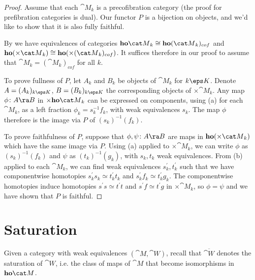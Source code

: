 \begin{proof}
Assume that each ${\cat M}_k$ is a precofibration category (the proof for prefibration categories is dual). Our functor $P$ is a bijection on objects, and we'd like to show that it is also fully faithful.

By  we have equivalences of categories ${\bf ho}{\cat M}_k \cong {\bf ho}({\cat M}_k)_{cof}$ and ${\bf ho}(\times{\cat M}_k) \cong {\bf ho}(\times({\cat M}_k)_{cof})$. It suffices therefore in our proof to assume that ${\cat M}_k = ({\cat M}_k)_{cof}$ for all $k$. 

To prove fullness of $P$, let $A_k$ and $B_k$ be objects of ${\cat M}_k$ for $k \eps K$. Denote $A = (A_k)_{k \eps K}$, $B = (B_k)_{k \eps K}$ the corresponding objects of $\times{\cat M}_k$. Any map $\phi \colon A \ra B$ in $\times{\bf ho}{\cat M}_k$ can be expressed on components, using  (a) for each ${\cat M}_k$, as a left fraction $\phi_k = s_k^{-1}f_k$, with weak equivalences $s_k$. The map $\phi$ therefore is the image via $P$ of $(s_k)^{-1}(f_k)$.

To prove faithfulness of $P$, suppose that $\phi, \psi \colon A \ra B$ are maps in ${\bf ho}({\times} {\cat M}_k)$ which have the same image via $P$. Using  (a) applied to ${\times} {\cat M}_k$, we can write $\phi$ as $(s_k)^{-1}(f_k)$ and $\psi$ as $(t_k)^{-1}(g_k)$, with $s_k, t_k$ weak equivalences. From  (b) applied to each ${\cat M}_k$, we can find weak equivalences $s^{'}_k, t^{'}_k$ such that we have componentwise homotopies $s^{'}_ks_k \simeq t^{'}_kt_k$ and $s^{'}_kf_k \simeq t^{'}_kg_k$. The componentwise homotopies induce homotopies $s^{'}s \simeq t^{'}t$ and $s^{'}f \simeq t^{'}g$ in ${\times} {\cat M}_k$, so $\phi = \psi$ and we have shown that $P$ is faithful.
\end{proof}


\section{Saturation}
\label{sec:saturation}
Given a category with weak equivalences $({\cat M}, {\cat W})$, recall that $\overline{\cat W}$ denotes the saturation of ${\cat W}$, i.e. the class of maps of ${\cat M}$ that become isomorphisms in ${\bf ho}{\cat M}$.

